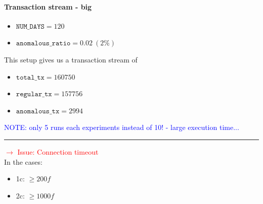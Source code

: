 \documentclass[12pt,a4paper]{article}
\begin{document}
\paragraph{Transaction stream - big\\}

\begin{itemize}
  \item $\texttt{NUM\_DAYS} = 120$
  \item $\texttt{anomalous\_ratio} = 0.02\ (2\%)$ 
\end{itemize}

This setup gives us a transaction stream of 
\begin{itemize}
  \item $\texttt{total\_tx} = 160750$
  \item $\texttt{regular\_tx} = 157756$
  \item $\texttt{anomalous\_tx} = 2994$
\end{itemize}

\textcolor{blue}{NOTE: only 5 runs each experiments instead of 10! - large execution time...}

\rule{\textwidth}{0.4pt} 
\textcolor{red}{$\rightarrow$ Issue: Connection timeout\\}
In the cases: 
\begin{itemize}
    \item 1c: $\ge 200f$
    \item 2c: $\ge 1000f$
\end{itemize}
\end{document}

